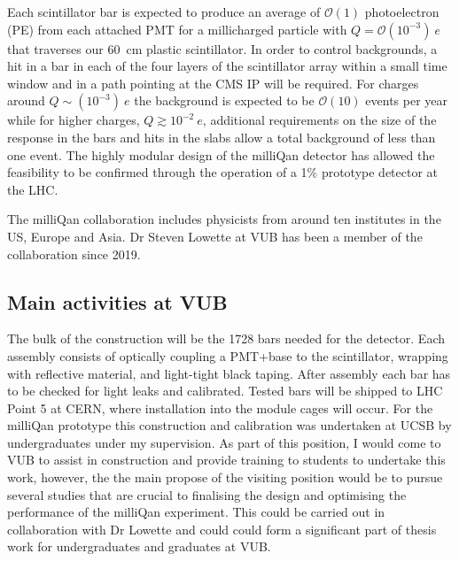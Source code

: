 \documentclass[11pt]{article}
\theoremstyle{plain} \numberwithin{equation}{section}
\theoremstyle{definition}
\begin{document}

Each scintillator bar is expected to produce an average of $\mathcal{O}(1)$ photoelectron (PE) 
from each attached PMT for a millicharged particle with $Q=\mathcal{O}(10^{-3})~e$ that traverses 
our 60~cm plastic scintillator. In order to control backgrounds, a hit in
a bar in each of the four layers of the scintillator array within a small time 
window and in a path pointing at the CMS IP will be required. For charges around 
$Q\sim(10^{-3})~e$ the background is expected to be $\mathcal{O}(10)$ events per year while for higher
charges, $Q\gtrsim 10^{-2}~e$, additional requirements on the size of the response in the bars and hits in the slabs
allow a total background of less than one event. The highly modular design of the milliQan detector has allowed the feasibility 
to be confirmed through the operation of a 1\% prototype detector at the LHC.

The milliQan collaboration includes physicists from around ten institutes in the US, 
Europe and Asia. Dr Steven Lowette at VUB has been a member of the collaboration since
2019.  

\subsection*{Main activities at VUB}

The bulk of the construction will be the 1728 bars needed for the detector. 
Each assembly consists of optically coupling a PMT+base to the scintillator, 
wrapping with reflective material, and light-tight black taping. 
After assembly each bar has to be checked for light leaks and calibrated. 
Tested bars will be shipped to LHC Point 5 at CERN, where installation into the module 
cages will occur. For the milliQan prototype this construction
and calibration was undertaken at UCSB by undergraduates under my supervision.
As part of this position, I would come to VUB to assist in construction and
provide training to students to undertake this work, however, the
the main propose of the visiting position would be to pursue several
studies that are crucial to finalising the design and optimising the performance 
of the milliQan experiment. This could be carried out in collaboration with Dr Lowette and
could could form a significant part of thesis work for undergraduates and graduates at VUB.
\end{document}
